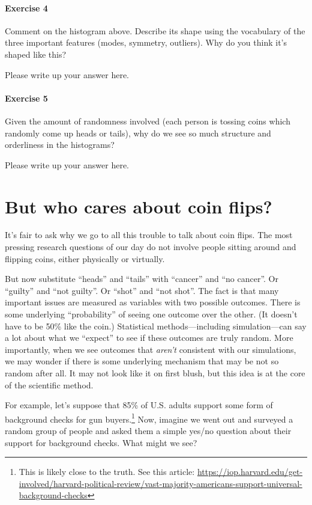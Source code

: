\documentclass[
]{book}
\begin{document}
\hypertarget{exercise-4-4}{%
\paragraph*{Exercise 4}\label{exercise-4-4}}

Comment on the histogram above. Describe its shape using the vocabulary of the three important features (modes, symmetry, outliers). Why do you think it's shaped like this?

Please write up your answer here.

\hypertarget{exercise-5-4}{%
\paragraph*{Exercise 5}\label{exercise-5-4}}

Given the amount of randomness involved (each person is tossing coins which randomly come up heads or tails), why do we see so much structure and orderliness in the histograms?

Please write up your answer here.

\hypertarget{randomization1-who-cares}{%
\section{But who cares about coin flips?}\label{randomization1-who-cares}}

It's fair to ask why we go to all this trouble to talk about coin flips. The most pressing research questions of our day do not involve people sitting around and flipping coins, either physically or virtually.

But now substitute ``heads'' and ``tails'' with ``cancer'' and ``no cancer''. Or ``guilty'' and ``not guilty''. Or ``shot'' and ``not shot''. The fact is that many important issues are measured as variables with two possible outcomes. There is some underlying ``probability'' of seeing one outcome over the other. (It doesn't have to be 50\% like the coin.) Statistical methods---including simulation---can say a lot about what we ``expect'' to see if these outcomes are truly random. More importantly, when we see outcomes that \emph{aren't} consistent with our simulations, we may wonder if there is some underlying mechanism that may be not so random after all. It may not look like it on first blush, but this idea is at the core of the scientific method.

For example, let's suppose that 85\% of U.S. adults support some form of background checks for gun buyers.\footnote{This is likely close to the truth. See this article: \url{https://iop.harvard.edu/get-involved/harvard-political-review/vast-majority-americans-support-universal-background-checks}} Now, imagine we went out and surveyed a random group of people and asked them a simple yes/no question about their support for background checks. What might we see?
\end{document}
